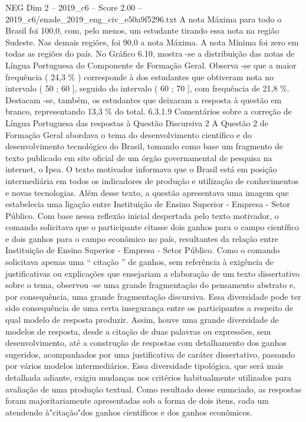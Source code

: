 \begin{textsample}{NEG Dim 2 – 2019\_c6 – Score 2.00 – 2019\_c6/enade\_2019\_eng\_civ\_e50a9f5296.txt}
A nota Máxima para todo o Brasil foi 100,0, com, pelo menos, um estudante tirando essa nota na região Sudeste.
Nas demais regiões, foi 90,0 a nota Máxima.
A nota Mínima foi zero em todas as regiões do país.
No Gráfico 6.10, mostra -se a distribuição das notas de Língua Portuguesa do Componente de Formação Geral.
Observa -se que a maior frequência ( 24,3 \% ) corresponde à dos estudantes que obtiveram nota no intervalo ( 50 ; 60 ], seguido do intervalo ( 60 ; 70 ], com frequência de 21,8 \%.
Destacam -se, também, os estudantes que deixaram a resposta à questão em branco, representando 13,3 \% do total. 6.3.1.9 Comentários sobre a correção de Língua Portuguesa das respostas à Questão Discursiva 2 A Questão 2 de Formação Geral abordava o tema do desenvolvimento científico e do desenvolvimento tecnológico do Brasil, tomando como base um fragmento de texto publicado em site oficial de um órgão governamental de pesquisa na internet, o Ipea.
O texto motivador informava que o Brasil está em posição intermediária em todos os indicadores de produção e utilização de conhecimentos e novas tecnologias.
Além desse texto, a questão apresentava uma imagem que estabelecia uma ligação entre Instituição de Ensino Superior - Empresa - Setor Público.
Com base nessa reflexão inicial despertada pelo texto motivador, o comando solicitava que o participante citasse dois ganhos para o campo científico e dois ganhos para o campo econômico no país, resultantes da relação entre Instituição de Ensino Superior - Empresa - Setor Público.
Como o comando solicitava apenas uma “ citação ” de ganhos, sem referência à exigência de justificativas ou explicações que ensejariam a elaboração de um texto dissertativo sobre o tema, observou -se uma grande fragmentação do pensamento abstrato e, por consequência, uma grande fragmentação discursiva.
Essa diversidade pode ter sido consequência de uma certa insegurança entre os participantes a respeito de qual modelo de resposta produzir.
Assim, houve uma grande diversidade de modelos de resposta, desde a citação de duas palavras ou expressões, sem desenvolvimento, até a construção de respostas com detalhamento dos ganhos sugeridos, acompanhados por uma justificativa de caráter dissertativo, passando por vários modelos intermediários.
Essa diversidade tipológica, que será mais detalhada adiante, exigiu mudanças nos critérios habitualmente utilizados para avaliação de uma produção textual.
Como resultado desse enunciado, as respostas foram majoritariamente apresentadas sob a forma de dois itens, cada um atendendo à"citação"dos ganhos científicos e dos ganhos econômicos.

\end{textsample}
